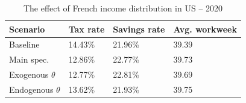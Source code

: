 \begin{table}[!htb]
\centering
\begin{threeparttable}
\caption{The effect of French income distribution in US -- 2020}
\label{table:US_ESC:incomeDistr}
\renewcommand{\arraystretch}{1.25}
\begin{tabularx}{.9\textwidth}{lYYY}
\toprule
\textbf{Scenario} & \textbf{Tax rate} & \textbf{Savings rate} & \textbf{Avg. workweek}\\
\midrule 
Baseline & 14.43\% & 21.96\% & 39.39 \\
Main spec. & 12.86\% & 22.77\% & 39.73 \\
Exogenous $\theta$ & 12.77\% & 22.81\% & 39.69 \\
Endogenous $\theta$ & 13.62\% & 21.93\% & 39.75 \\
\bottomrule
\end{tabularx}
\end{threeparttable}
\end{table}
